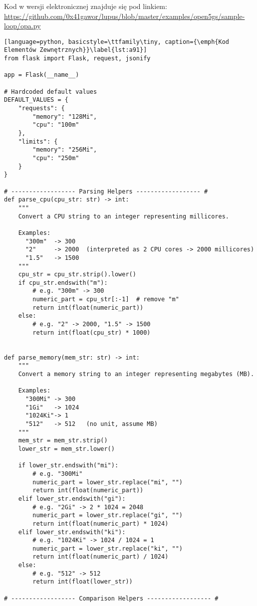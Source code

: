 \hypertarget{appendix:9}{}

Kod w wersji elektronicznej znajduje się pod linkiem: \url{https://github.com/0x41gawor/lupus/blob/master/examples/open5gs/sample-loop/opa.py}

\begin{lstlisting}[language=python, basicstyle=\ttfamily\tiny, caption={\emph{Kod Elementów Zewnętrznych}}\label{lst:a91}]
from flask import Flask, request, jsonify

app = Flask(__name__)

# Hardcoded default values
DEFAULT_VALUES = {
    "requests": {
        "memory": "128Mi",
        "cpu": "100m"
    },
    "limits": {
        "memory": "256Mi",
        "cpu": "250m"
    }
}

# ------------------ Parsing Helpers ------------------ #
def parse_cpu(cpu_str: str) -> int:
    """
    Convert a CPU string to an integer representing millicores.
    
    Examples:
      "300m"  -> 300
      "2"     -> 2000  (interpreted as 2 CPU cores -> 2000 millicores)
      "1.5"   -> 1500
    """
    cpu_str = cpu_str.strip().lower()
    if cpu_str.endswith("m"):
        # e.g. "300m" -> 300
        numeric_part = cpu_str[:-1]  # remove "m"
        return int(float(numeric_part))
    else:
        # e.g. "2" -> 2000, "1.5" -> 1500
        return int(float(cpu_str) * 1000)


def parse_memory(mem_str: str) -> int:
    """
    Convert a memory string to an integer representing megabytes (MB).
    
    Examples:
      "300Mi" -> 300
      "1Gi"   -> 1024
      "1024Ki"-> 1
      "512"   -> 512   (no unit, assume MB)
    """
    mem_str = mem_str.strip()
    lower_str = mem_str.lower()

    if lower_str.endswith("mi"):
        # e.g. "300Mi"
        numeric_part = lower_str.replace("mi", "")
        return int(float(numeric_part))
    elif lower_str.endswith("gi"):
        # e.g. "2Gi" -> 2 * 1024 = 2048
        numeric_part = lower_str.replace("gi", "")
        return int(float(numeric_part) * 1024)
    elif lower_str.endswith("ki"):
        # e.g. "1024Ki" -> 1024 / 1024 = 1
        numeric_part = lower_str.replace("ki", "")
        return int(float(numeric_part) / 1024)
    else:
        # e.g. "512" -> 512
        return int(float(lower_str))

# ------------------ Comparison Helpers ------------------ #


\end{lstlisting}
